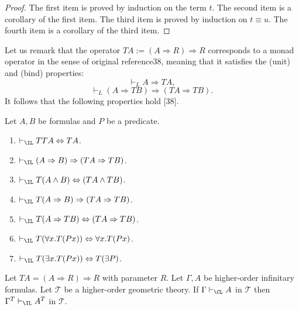 \begin{proof}The first item is proved by induction on the term $t$. The second item is a corollary of the first item. The third item is proved by induction on $t\equiv u$. The fourth item is a corollary of the third item.\end{proof}
Let us remark that the operator $TA:=(A\Rightarrow R)\Rightarrow R$ corresponds to a monad operator in the sense of original reference38, meaning that it satisfies the (unit) and (bind) properties:
\[\vdash_L A\Rightarrow TA,\tag{unit}\]
\[\vdash_L(A\Rightarrow TB)\Rightarrow(TA\Rightarrow TB).\tag{bind}\]
It follows that the following properties hold [38].
\begin{authorprop}[41]
Let $A,B$ be formulas and $P$ be a predicate.
\begin{enumerate}\item $\vdash_\IL TTA\Leftrightarrow TA$.\item $\vdash_\IL(A\Rightarrow B)\Rightarrow(TA\Rightarrow TB)$.\item $\vdash_\IL T(A\wedge B)\Leftrightarrow(TA\wedge TB)$.\item $\vdash_\IL T(A\Rightarrow B)\Rightarrow(TA\Rightarrow TB)$.\item $\vdash_\IL T(A\Rightarrow TB)\Leftrightarrow(TA\Rightarrow TB)$.\item $\vdash_\IL T(\forall x.T(Px))\Leftrightarrow\forall x.T(Px)$.\item $\vdash_\IL T(\exists x.T(Px))\Leftrightarrow T(\exists P)$.\end{enumerate}
\end{authorprop}
\begin{authortheorem}[42]
Let $TA=(A\Rightarrow R)\Rightarrow R$ with parameter $R$. Let $\Gamma,A$ be higher-order infinitary formulas. Let $\mathcal T$ be a higher-order geometric theory. If $\Gamma\vdash_\CL A$ in $\mathcal T$ then $\Gamma^T\vdash_\IL A^T$ in $\mathcal T$.
\end{authortheorem}
